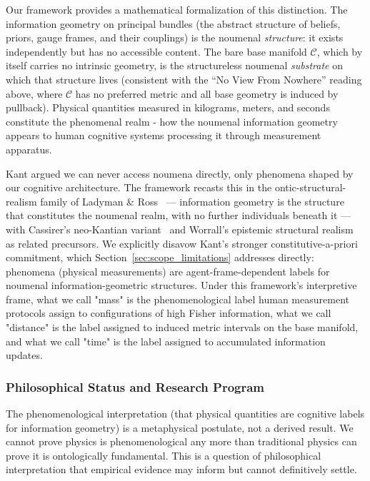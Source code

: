 \documentclass[11pt]{article}
\begin{document}
Our framework provides a mathematical formalization of this distinction. The information geometry on principal bundles (the abstract structure of beliefs, priors, gauge frames, and their couplings) is the noumenal \emph{structure}: it exists independently but has no accessible content. The bare base manifold $\mathcal{C}$, which by itself carries no intrinsic geometry, is the structureless noumenal \emph{substrate} on which that structure lives (consistent with the ``No View From Nowhere'' reading above, where $\mathcal{C}$ has no preferred metric and all base geometry is induced by pullback). Physical quantities measured in kilograms, meters, and seconds constitute the phenomenal realm - how the noumenal information geometry appears to human cognitive systems processing it through measurement apparatus.

Kant argued we can never access noumena directly, only phenomena shaped by our cognitive architecture. The framework recasts this in the ontic-structural-realism family of Ladyman \& Ross~\cite{Ladyman2007} — information geometry is the structure that constitutes the noumenal realm, with no further individuals beneath it — with Cassirer's neo-Kantian variant~\cite{Cassirer1923} and Worrall's epistemic structural realism~\cite{Worrall1989} as related precursors. We explicitly disavow Kant's stronger constitutive-a-priori commitment, which Section~\ref{sec:scope_limitations} addresses directly: phenomena (physical measurements) are agent-frame-dependent labels for noumenal information-geometric structures. Under this framework's interpretive frame, what we call "mass" is the phenomenological label human measurement protocols assign to configurations of high Fisher information, what we call "distance" is the label assigned to induced metric intervals on the base manifold, and what we call "time" is the label assigned to accumulated information updates.

\subsubsection{Philosophical Status and Research Program}

The phenomenological interpretation (that physical quantities are cognitive labels for information geometry) is a metaphysical postulate, not a derived result. We cannot prove physics is phenomenological any more than traditional physics can prove it is ontologically fundamental. This is a question of philosophical interpretation that empirical evidence may inform but cannot definitively settle.
\end{document}
